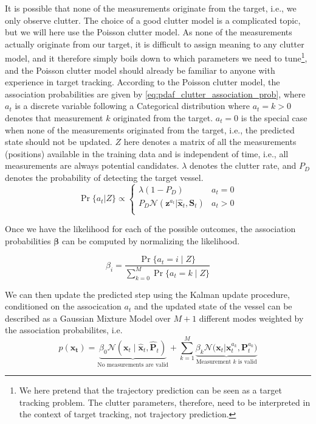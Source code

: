 It is possible that none of the measurements originate from the target, i.e., we only observe clutter. The choice of a good clutter model is a complicated topic, but we will here use the Poisson clutter model. As none of the measurements actually originate from our target, it is difficult to assign meaning to any clutter model, and it therefore simply boils down to which parameters we need to tune\footnote{We here pretend that the trajectory prediction can be seen as a target tracking problem. The clutter parameters, therefore, need to be interpreted in the context of target tracking, not trajectory prediction.}, and the Poisson clutter model should already be familiar to anyone with experience in target tracking.
According to the Poisson clutter model, the association probabilities are given by \cref{eq:pdaf_clutter_association_prob}, where $a_t$ is a discrete variable following a Categorical distribution where $a_t=k > 0$ denotes that measurement $k$ originated from the target. $a_t = 0$ is the special case when none of the measurements originated from the target, i.e., the predicted state should not be updated. $Z$ here denotes a matrix of all the measurements (positions) available in the training data and is independent of time, i.e., all measurements are always potential candidates. $\lambda$ denotes the clutter rate, and $P_D$ denotes the probability of detecting the target vessel.
\begin{equation}\label{eq:pdaf_clutter_association_prob}
    \Pr\{a_t | Z\} \propto \begin{cases}
        \lambda (1 - P_D) &  a_t = 0\\
        P_D \mathcal{N} (\boldsymbol{z}^{a_t} | \hat{\boldsymbol{x}}_t, \boldsymbol{S}_t) & a_t > 0\\
    \end{cases}
\end{equation}

Once we have the likelihood for each of the possible outcomes, the association probabilities $\boldsymbol{\beta}$ can be computed by normalizing the likelihood. 

\begin{equation}
    \beta_i = \frac{\Pr\{a_t=i \; | \; Z\}}{\sum_{k=0}^M \Pr\{a_t=k \; | \; Z\}}
\end{equation}

We can then update the predicted step using the Kalman update procedure, conditioned on the assocication $a_t$ and the updated state of the vessel can be described as a Gaussian Mixture Model over $M+1$ different modes weighted by the association probabilites, i.e. 
\begin{equation}
    p(\boldsymbol{x_t}) = \underbrace{\beta_0 \mathcal{N}(\boldsymbol{x}_t \; | \; \hat{\boldsymbol{x}}_t, \hat{\boldsymbol{P}}_t)}_{\text{No measurements are valid}} + \sum_{k=1}^M \underbrace{\beta_k \mathcal{N}\big(\boldsymbol{x}_t | \boldsymbol{x}_t^{a_k}, \boldsymbol{P}_t^{a_k}\big)}_{\text{Measurement $k$ is valid}}
\end{equation}

